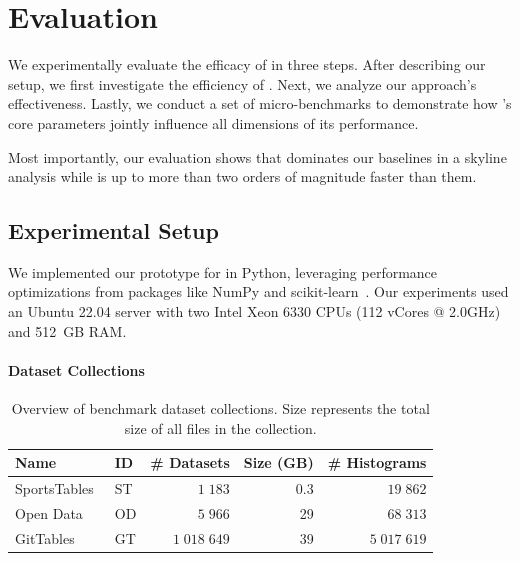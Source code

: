 
\vspace{-0.1em}
\section{Evaluation}
\label{sec:evaluation}

We experimentally evaluate the efficacy of \system{} in three steps.
After describing our setup, we first investigate the efficiency of \system{}.
Next, we analyze our approach's effectiveness.
Lastly, we conduct a set of micro-benchmarks to demonstrate how \system{}'s core parameters jointly influence all dimensions of its performance.

Most importantly, our evaluation shows that \exact{} dominates our baselines in a skyline analysis while \approximate{} is up to more than two orders of magnitude faster than them.

\vspace{-0.3em}
\subsection{Experimental Setup}
\label{sec:setup}

We implemented our prototype for \system{} in Python, leveraging performance optimizations from packages like NumPy and scikit-learn~\cite{pedregosa_scikit-learn_2011}.
Our experiments used an Ubuntu 22.04 server with two Intel Xeon 6330 CPUs (112 vCores @ 2.0GHz) and 512~GB RAM.

\paragraph{Dataset Collections}

\begin{table}[t]
    \caption{Overview of benchmark dataset collections. Size represents the total size of all files in the collection.}
    \label{tab:dataset_collections}
    \centering
    \footnotesize
    \begin{tabularx}{\linewidth}{ >{\raggedright\arraybackslash}X l r r r }
        \toprule
        Name & ID & \# Datasets & Size (GB) & \# Histograms \\
        \midrule
         SportsTables~\cite{langenecker_sportstables_2023}  & ST & $1\;183$      & 0.3 & $19\;862$ \\
         Open Data~\cite{galhotra_metam_2023}               & OD & $5\;966$      & 29  & $68\;313$ \\
         GitTables~\cite{hulsebos_gittables_2023}           & GT & $1\;018\;649$ & 39  & $5\;017\;619$ \\
         \bottomrule
    \end{tabularx}
\end{table}

